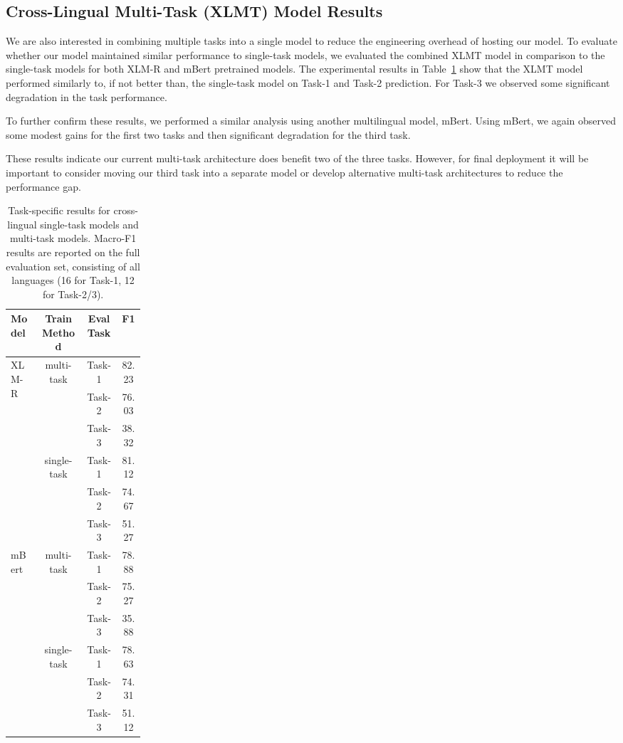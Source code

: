 \documentclass[letterpaper]{article} %
\begin{document}
\subsection*{Cross-Lingual Multi-Task (XLMT) Model Results}
We are also interested in combining multiple tasks into a single model to reduce the engineering overhead of hosting our model.
To evaluate whether our model maintained similar performance to single-task models, we evaluated the combined XLMT model in comparison to the single-task models for both XLM-R and mBert pretrained models.
The experimental results in Table~\ref{table:tasks} show that the XLMT model performed similarly to, if not better than, the single-task model on Task-1 and Task-2 prediction.
For Task-3 we observed some significant degradation in the task performance.

To further confirm these results, we performed a similar analysis using another multilingual model, mBert.
Using mBert, we again observed some modest gains for the first two tasks and then significant degradation for the third task.

These results indicate our current multi-task architecture does benefit two of the three tasks. 
However, for final deployment it will be important to consider moving our third task into a separate model or develop alternative multi-task architectures to reduce the performance gap.

\begin{table}[!htb]
\centering
\renewcommand{\arraystretch}{1.2}
\begin{tabular}{ m{0.22\linewidth}|ccc }
    \hline
    \textbf{Model} & \textbf{Train Method} & \textbf{Eval Task} & \textbf{F1} \\
    \hline
    \multirow{6}{*}{XLM-R} & \multirow{3}{*}{multi-task}& Task-1 & 82.23 \\
     &  & Task-2 & 76.03 \\
     &  & Task-3 & 38.32 \\
     \cline{2-4}
     & \multirow{3}{*}{single-task} & Task-1 & 81.12 \\
     &  & Task-2 & 74.67 \\
     &  & Task-3 & 51.27 \\
    \hline
    \multirow{6}{*}{mBert} &  \multirow{3}{*}{multi-task} & Task-1 & 78.88 \\
     &  & Task-2 & 75.27 \\
     &  & Task-3 & 35.88 \\
     \cline{2-4}
     &  \multirow{3}{*}{single-task} & Task-1 & 78.63 \\
     &  & Task-2 & 74.31 \\
     &  & Task-3 & 51.12 \\
    \hline
\end{tabular}
\caption{Task-specific results for cross-lingual single-task models and multi-task models. Macro-F1 results are reported on the full evaluation set, consisting of all languages (16 for Task-1, 12 for Task-2/3).}
\label{table:tasks}
\end{table}
\end{document}
